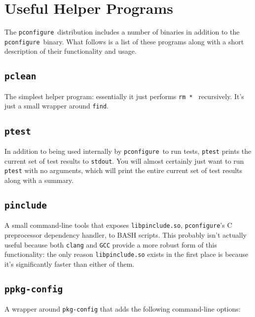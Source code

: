 \documentclass{article}
\newcommand{\pconfigure}{\texttt{pconfigure}}
\begin{document}
\section{Useful Helper Programs \label{prog}}

The \pconfigure\ distribution includes a number of binaries in
addition to the \pconfigure\ binary.  What follows is a list of these
programs along with a short description of their functionality and
usage.

\subsection{\texttt{pclean} \label{prog:pclean}}

The simplest helper program: essentially it just performs \texttt{rm
  *~} recursively.  It's just a small wrapper around \texttt{find}.

\subsection{\texttt{ptest} \label{prog:ptest}}

In addition to being used internally by \pconfigure\ to run tests,
\texttt{ptest} prints the current set of test results to
\texttt{stdout}.  You will almost certainly just want to run
\texttt{ptest} with no arguments, which will print the entire current
set of test results along with a summary.

\subsection{\texttt{pinclude} \label{prog:pinclude}}

A small command-line tools that exposes \texttt{libpinclude.so},
\pconfigure's C preprocessor dependency handler, to BASH scripts.
This probably isn't actually useful because both \texttt{clang} and
\texttt{GCC} provide a more robust form of this functionality: the
only reason \texttt{libpinclude.so} exists in the first place is
because it's significantly faster than either of them.

\subsection{\texttt{ppkg-config} \label{prog:ppkg-config}}

A wrapper around \texttt{pkg-config} that adds the following
command-line options:
\end{document}
